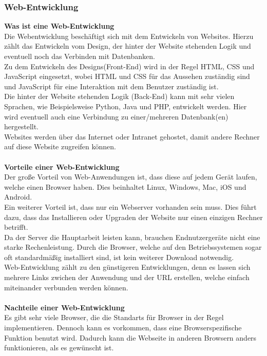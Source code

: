 \documentclass[ngerman]{article}
\begin{document}
    \subsubsection{Web-Entwicklung}
    \textbf{Was ist eine Web-Entwicklung}\\
    Die Webentwicklung beschäftigt sich mit dem Entwickeln von Websites. Hierzu zählt das Entwickeln vom Design, der hinter der Website stehenden Logik und eventuell noch das Verbinden mit Datenbanken.\\
    Zu dem Entwickeln des Designs(Front-End) wird in der Regel HTML, CSS und JavaScript eingesetzt, wobei HTML und CSS für das Aussehen zuständig sind und JavaScript für eine Interaktion mit dem Benutzer zuständig ist.\\
    Die hinter der Website stehenden Logik (Back-End) kann mit sehr vielen Sprachen, wie Beispielsweise Python, Java und PHP, entwickelt werden. Hier wird eventuell auch eine Verbindung zu einer/mehreren Datenbank(en) hergestellt.\\
    Websites werden über das Internet oder Intranet gehostet, damit andere Rechner auf diese Website zugreifen können. \cite{WebDevelopment2}\\\\
    \textbf{Vorteile einer Web-Entwicklung}\\
    Der große Vorteil von Web-Anwendungen ist, dass diese auf jedem Gerät laufen, welche einen Browser haben. Dies beinhaltet Linux, Windows, Mac, iOS und Android.\\
    Ein weiterer Vorteil ist, dass nur ein Webserver vorhanden sein muss. Dies führt dazu, dass das Installieren oder Upgraden der Website nur einen einzigen Rechner betrifft.\\
    Da der Server die Hauptarbeit leisten kann, brauchen Endnutzergeräte nicht eine starke Rechenleistung.\cite{AdvantagesWebDevelopment}
    Durch die Browser, welche auf den Betriebssystemen sogar oft standardmäßig installiert sind, ist kein weiterer Download notwendig.\\
    Web-Entwicklung zählt zu den günstigeren Entwicklungen, denn es lassen sich mehrere Links zwichen der Anwendung und der URL erstellen, welche einfach miteinander verbunden werden können.\cite{ADWebDevelopment}\\\\
    \textbf{Nachteile einer Web-Entwicklung}\\
    Es gibt sehr viele Browser, die die Standarts für Browser in der Regel implementieren. Dennoch kann es vorkommen, dass eine Browserspezifische Funktion benutzt wird. Dadurch kann die Webseite in anderen Browsern anders funktionieren, als es gewünscht ist.\cite{WebDevelopment}\\
\end{document}
